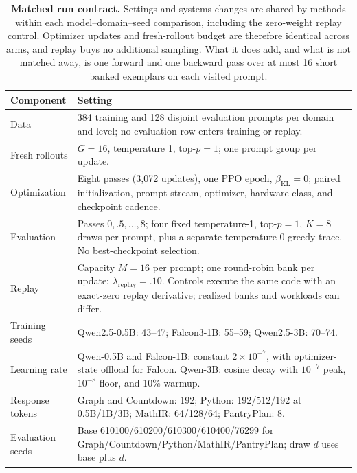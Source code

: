 \documentclass{article}
\newcommand{\1}{\mathbf 1}
\theoremstyle{remark}
\theoremstyle{definition}
\theoremstyle{plain}
\begin{document}
\begin{table}[H]
  \centering
  \caption{\textbf{Matched run contract.} Settings and systems changes are
  shared by methods within each model--domain--seed comparison, including
  the zero-weight replay control. Optimizer updates and fresh-rollout budget
  are therefore identical across arms, and replay buys no additional sampling.
  What it does add, and what is not matched away, is one forward and one
  backward pass over at most 16 short banked exemplars on each visited prompt.}
  \label{tab:run-contract}
  \small
  \begin{tabularx}{\linewidth}{@{}P{.23\linewidth}Y@{}}
    \toprule
    \textbf{Component} & \textbf{Setting} \\
    \midrule
    Data & 384 training and 128 disjoint evaluation prompts per domain and
      level; no evaluation row enters training or replay. \\
    Fresh rollouts & $G=16$, temperature 1, top-$p=1$; one prompt group per update. \\
    Optimization & Eight passes (3,072 updates), one PPO epoch,
      $\beta_{\mathrm{KL}}=0$; paired initialization, prompt stream,
      optimizer, hardware class, and checkpoint cadence. \\
    Evaluation & Passes $0,.5,\ldots,8$; four fixed temperature-1,
      top-$p=1$, $K=8$ draws per prompt, plus a separate temperature-0
      greedy trace. No best-checkpoint selection. \\
    Replay & Capacity $M=16$ per prompt; one round-robin bank per update;
      $\lambda_{\mathrm{replay}}=.10$. Controls execute the same code with
      an exact-zero replay derivative; realized banks and workloads can differ. \\
    Training seeds & Qwen2.5-0.5B: 43--47; Falcon3-1B: 55--59;
      Qwen2.5-3B: 70--74. \\
    Learning rate & Qwen-0.5B and Falcon-1B: constant $2\times10^{-7}$,
      with optimizer-state offload for Falcon. Qwen-3B: cosine decay with
      $10^{-7}$ peak, $10^{-8}$ floor, and 10\% warmup. \\
    Response tokens & Graph and Countdown: 192; Python: 192/512/192
      at 0.5B/1B/3B; MathIR: 64/128/64; PantryPlan: 8. \\
    Evaluation seeds & Base 610100/610200/610300/610400/76299 for
      Graph/Countdown/Python/MathIR/PantryPlan; draw $d$ uses base plus $d$. \\
    \bottomrule
  \end{tabularx}
\end{table}
\end{document}

